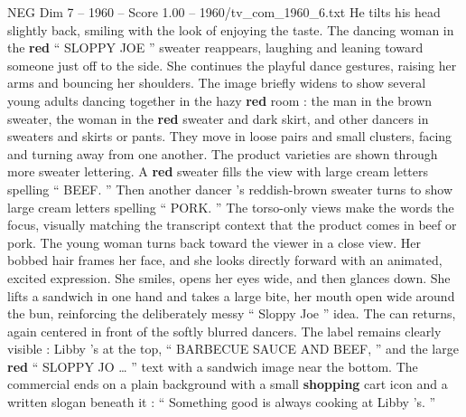 \begin{textsample}{NEG Dim 7 – 1960 – Score 1.00 – 1960/tv\_com\_1960\_6.txt}
He tilts his head slightly back, smiling with the look of enjoying the taste.
The dancing woman in the \textbf{red} “ SLOPPY JOE ” sweater reappears, laughing and leaning toward someone just off to the side.
She continues the playful dance gestures, raising her arms and bouncing her shoulders.
The image briefly widens to show several young adults dancing together in the hazy \textbf{red} room : the man in the brown sweater, the woman in the \textbf{red} sweater and dark skirt, and other dancers in sweaters and skirts or pants.
They move in loose pairs and small clusters, facing and turning away from one another.
The product varieties are shown through more sweater lettering.
A \textbf{red} sweater fills the view with large cream letters spelling “ BEEF. ” Then another dancer ’s reddish-brown sweater turns to show large cream letters spelling “ PORK. ” The torso-only views make the words the focus, visually matching the transcript context that the product comes in beef or pork.
The young woman turns back toward the viewer in a close view.
Her bobbed hair frames her face, and she looks directly forward with an animated, excited expression.
She smiles, opens her eyes wide, and then glances down.
She lifts a sandwich in one hand and takes a large bite, her mouth open wide around the bun, reinforcing the deliberately messy “ Sloppy Joe ” idea.
The can returns, again centered in front of the softly blurred dancers.
The label remains clearly visible : Libby ’s at the top, “ BARBECUE SAUCE AND BEEF, ” and the large \textbf{red} “ SLOPPY JO … ” text with a sandwich image near the bottom.
The commercial ends on a plain background with a small \textbf{shopping} cart icon and a written slogan beneath it : “ Something good is always cooking at Libby ’s. ”

\end{textsample}
